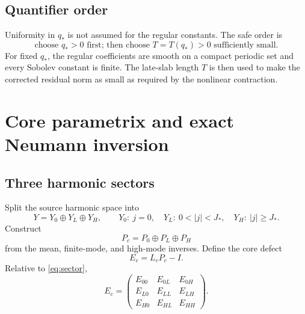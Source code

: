 \documentclass[11pt]{article}
\numberwithin{equation}{section}
\begin{document}
\subsection{Quantifier order}
Uniformity in \(q_*\) is not assumed for the regular constants.  The safe order is
\begin{equation}
\boxed{\text{choose }q_*>0\text{ first; then choose }T=T(q_*)>0\text{ sufficiently small}.}
\label{eq:quantifier}
\end{equation}
For fixed \(q_*\), the regular coefficients are smooth on a compact periodic set and every Sobolev constant is finite.  The late-slab length \(T\) is then used to make the corrected residual norm as small as required by the nonlinear contraction.

\section{Core parametrix and exact Neumann inversion}\label{sec:core}

\subsection{Three harmonic sectors}
Split the source harmonic space into
\begin{equation}
Y=Y_0\oplus Y_L\oplus Y_H,
\qquad
Y_0:\ j=0,
\quad
Y_L:\ 0<|j|<J_*,
\quad
Y_H:\ |j|\ge J_*.
\label{eq:sector}
\end{equation}
Construct
\begin{equation}
P_c=P_0\oplus P_L\oplus P_H
\label{eq:parametrix}
\end{equation}
from the mean, finite-mode, and high-mode inverses.  Define the core defect
\begin{equation}
E_c=L_cP_c-I.
\label{eq:defect}
\end{equation}
Relative to \eqref{eq:sector},
\begin{equation}
E_c=
\begin{pmatrix}
E_{00}&E_{0L}&E_{0H}\\
E_{L0}&E_{LL}&E_{LH}\\
E_{H0}&E_{HL}&E_{HH}
\end{pmatrix}.
\label{eq:matrix}
\end{equation}
\end{document}
